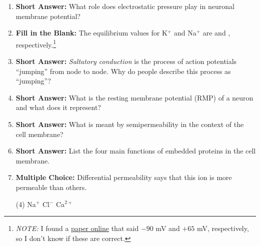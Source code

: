 \begin{enumerate}[label=\textbf{Q2.3.\arabic*}]
      \item \textbf{Short Answer:} What role does electrostatic pressure play in neuronal membrane potential? \\

      \item \textbf{Fill in the Blank:} The equilibrium values for K\(^{+}\) and Na\(^{+}\) are  and , respectively.\footnote{\textit{NOTE:} I found a \href{http://bit.ly/3FrAGQQ}{paper online} that said \(-90\) mV and \(+65\) mV, respectively, so I don't know if these are correct.}

      \item \textbf{Short Answer:} \textit{Saltatory conduction} is the process of action potentials ``jumping'' from node to node. Why do people describe this process as ``jumping''? \\

      \item \textbf{Short Answer:} What is the resting membrane potential (RMP) of a neuron and what does it represent? \\ 

      \item \textbf{Short Answer:} What is meant by semipermeability in the context of the cell membrane? \\

      \item \textbf{Short Answer:} List the four main functions of embedded proteins in the cell membrane. \\

      \item \textbf{Multiple Choice:} Differential permeability says that this ion is more permeable than others. 
      \begin{tasks}[label=\textcolor{draculafg}{(\Alph*)}, item-format=\color{draculafg}, label-width=1.5em, item-indent=1.7em](4)
            \task Na\(^{+}\)
            \task {}
            \task Cl\(^{-}\)
            \task Ca\(^{2+}\)
      \end{tasks}


\end{enumerate}
